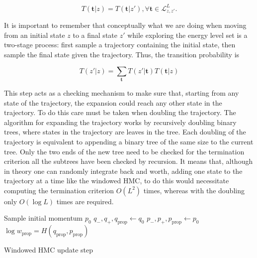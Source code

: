 \documentclass[]{report}
\begin{document}
\[T(\mathbf{t}|z) = T(\mathbf{t}|z') , \forall \mathbf{t} \in \mathcal{L}^L_{z,z'} . \]

It is important to remember that conceptually what we are doing when moving from an initial state $z$ to a final state $z'$ while exploring the energy level set is a two-stage process: first sample a trajectory containing the initial state, then sample the final state given the trajectory.  Thus, the transition probability is 

\[T(z'|z) = \sum_{\mathbf{t}} T(z'|\mathbf{t}) T(\mathbf{t}|z) \]

This step acts as a checking mechanism to make sure that, starting from any state of the trajectory, the expansion could reach any other state in the trajectory. To do this care must be taken when doubling the trajectory. The algorithm for expanding the trajectory works by recursively doubling binary trees, where states in the trajectory are leaves in the tree. Each doubling of the trajectory is equivalent to appending a binary tree of the same size to the current tree. Only the two ends of the new tree need to be checked for the termination criterion all the subtrees have been checked by recursion.
It means that, although in theory one can randomly integrate back and worth, adding one state to the trajectory at a time like the windowed HMC, to do this would necessitate  computing the termination criterion $O(L^2)$ times, whereas with the doubling only $O(\log L)$ times are required. 



\begin{algorithm}
Sample initial momentum $p_0$ \;
$q_-,q_+, q_{\text{prop}} \leftarrow q_0$\;
$p_-,p_+, p_{\text{prop}} \leftarrow p_0$ \;
$\log w_{\text{prop}} = H(q_{\text{prop}},p_{\text{prop}}) $ \;

\caption{Windowed HMC update step}
\end{algorithm}
\end{document}
